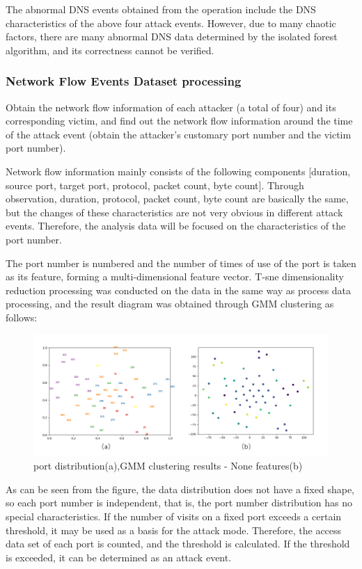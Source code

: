 \documentclass[12pt,journal,draftcls,doublespace, letterpaper,onecolumn]{IEEEtran}
\begin{document}
The abnormal DNS events obtained from the operation include the DNS characteristics of the above four attack events. However, due to many chaotic factors, there are many abnormal DNS data determined by the isolated forest algorithm, and its correctness cannot be verified.

\subsubsection{Network Flow Events Dataset processing}
Obtain the network flow information of each attacker (a total of four) and its corresponding victim, and find out the network flow information around the time of the attack event (obtain the attacker's customary port number and the victim port number).

Network flow information mainly consists of the following components [duration, source port, target port, protocol, packet count, byte count]. Through observation, duration, protocol, packet count, byte count are basically the same, but the changes of these characteristics are not very obvious in different attack events. Therefore, the analysis data will be focused on the characteristics of the port number.

The port number is numbered and the number of times of use of the port is taken as its feature, forming a multi-dimensional feature vector. T-sne dimensionality reduction processing was conducted on the data in the same way as process data processing, and the result diagram was obtained through GMM clustering as follows:

\begin{figure}[htpb]
	\centering
	\includegraphics [width=1\textwidth]{9.png}
	\caption{port distribution(a),GMM clustering results - None features(b)}
	\label{fig}
\end{figure}

As can be seen from the figure, the data distribution does not have a fixed shape, so each port number is independent, that is, the port number distribution has no special characteristics. If the number of visits on a fixed port exceeds a certain threshold, it may be used as a basis for the attack mode. Therefore, the access data set of each port is counted, and the threshold is calculated. If the threshold is exceeded, it can be determined as an attack event.
\end{document}
